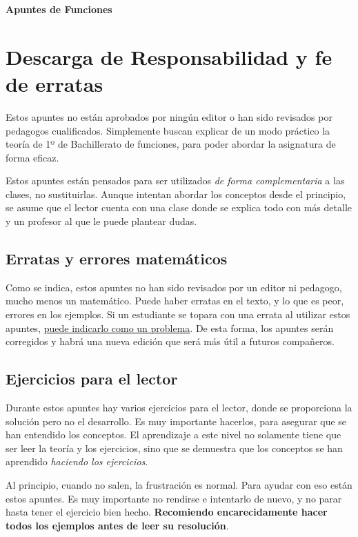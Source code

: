 \documentclass[sans]{apuntes}
\begin{document}
\begin{center}  %
	\LARGE \textbf{Apuntes de Funciones} %
\end{center}

\tableofcontents

\section*{Descarga de Responsabilidad y fe de erratas}
Estos apuntes no están aprobados por ningún editor o han sido revisados por pedagogos cualificados. Simplemente buscan explicar de un modo práctico la teoría de 1º de Bachillerato de funciones, para poder abordar la asignatura de forma eficaz. 
\par Estos apuntes están pensados para ser utilizados \emph{de forma complementaria} a las clases, no sustituirlas. Aunque intentan abordar los conceptos desde el principio, se asume que el lector cuenta con una clase donde se explica todo con más detalle y un profesor al que le puede plantear dudas.

\subsection*{Erratas y errores matemáticos}
Como se indica, estos apuntes no han sido revisados por un editor ni pedagogo, mucho menos un matemático. Puede haber erratas en el texto, y lo que es peor, errores en los ejemplos. Si un estudiante se topara con una errata al utilizar estos apuntes, \href{https://github.com/Ohmyus/clases-particulares/issues/new}{puede indicarlo como un problema}. De esta forma, los apuntes serán corregidos y habrá una nueva edición que será más útil a futuros compañeros.

\subsection*{Ejercicios para el lector}
Durante estos apuntes hay varios ejercicios para el lector, donde se proporciona la solución pero no el desarrollo. Es muy importante hacerlos, para asegurar que se han entendido los conceptos. El aprendizaje a este nivel no solamente tiene que ser leer la teoría y los ejercicios, sino que se demuestra que los conceptos se han aprendido \emph{haciendo los ejercicios}.
\par Al principio, cuando no salen, la frustración es normal. Para ayudar con eso están estos apuntes. Es muy importante no rendirse e intentarlo de nuevo, y no parar hasta tener el ejercicio bien hecho. \textbf{Recomiendo encarecidamente hacer todos los ejemplos antes de leer su resolución}.
\end{document}
